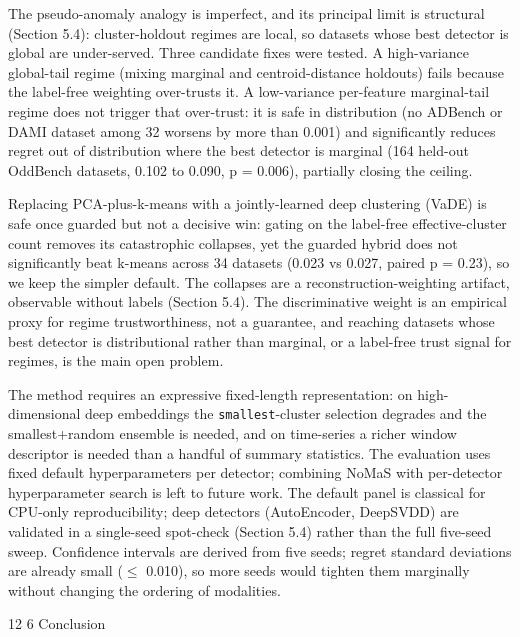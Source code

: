 \documentclass[3p,twocolumn]{elsarticle}
\makeatletter
\renewcommand\section{\@startsection{section}{1}{\z@}%
           {12\p@ \@plus 4\p@ \@minus 4\p@}%
           {6\p@ \@plus 4\p@ \@minus 3\p@}%
           {\normalsize\bfseries\boldmath}}
\makeatother
\begin{document}
The pseudo-anomaly analogy is imperfect, and its principal limit is structural (Section 5.4): cluster-holdout regimes are local, so datasets whose best detector is global are under-served. Three candidate fixes were tested. A high-variance global-tail regime (mixing marginal and centroid-distance holdouts) fails because the label-free weighting over-trusts it. A low-variance per-feature marginal-tail regime does not trigger that over-trust: it is safe in distribution (no ADBench or DAMI dataset among 32 worsens by more than 0.001) and significantly reduces regret out of distribution where the best detector is marginal (164 held-out OddBench datasets, 0.102 to 0.090, p = 0.006), partially closing the ceiling.

Replacing PCA-plus-k-means with a jointly-learned deep clustering (VaDE) is safe once guarded but not a decisive win: gating on the label-free effective-cluster count removes its catastrophic collapses, yet the guarded hybrid does not significantly beat k-means across 34 datasets (0.023 vs 0.027, paired p = 0.23), so we keep the simpler default. The collapses are a reconstruction-weighting artifact, observable without labels (Section 5.4). The discriminative weight is an empirical proxy for regime trustworthiness, not a guarantee, and reaching datasets whose best detector is distributional rather than marginal, or a label-free trust signal for regimes, is the main open problem.

The method requires an expressive fixed-length representation: on high-dimensional deep embeddings the \texttt{smallest}-cluster selection degrades and the smallest+random ensemble is needed, and on time-series a richer window descriptor is needed than a handful of summary statistics. The evaluation uses fixed default hyperparameters per detector; combining NoMaS with per-detector hyperparameter search is left to future work. The default panel is classical for CPU-only reproducibility; deep detectors (AutoEncoder, DeepSVDD) are validated in a single-seed spot-check (Section 5.4) rather than the full five-seed sweep. Confidence intervals are derived from five seeds; regret standard deviations are already small ($\leq$ 0.010), so more seeds would tighten them marginally without changing the ordering of modalities.

\section{Conclusion}\label{8-conclusion}
\end{document}
